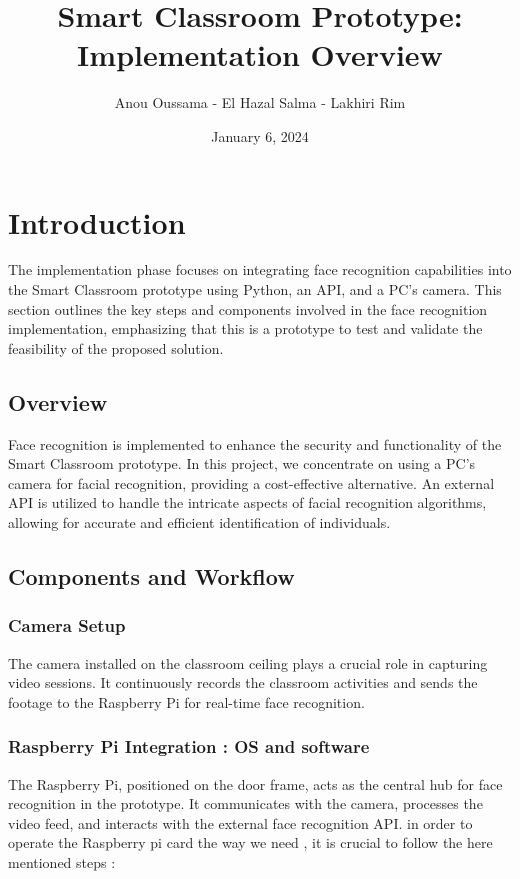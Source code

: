\documentclass[11pt]{article}
\title{\textbf{Smart Classroom Prototype: Implementation Overview}}
\author{Anou Oussama - El Hazal Salma - Lakhiri Rim}
\date{January 6, 2024}
\begin{document}
	\maketitle
	
	\section{Introduction}
	\hspace{1cm} The implementation phase focuses on integrating face recognition capabilities into the Smart Classroom prototype using Python, an API, and a PC's camera. This section outlines the key steps and components involved in the face recognition implementation, emphasizing that this is a prototype to test and validate the feasibility of the proposed solution.
	
	\hspace{1cm} \subsection{Overview}
	\hspace{1cm} Face recognition is implemented to enhance the security and functionality of the Smart Classroom prototype. In this project, we concentrate on using a PC's camera for facial recognition, providing a cost-effective alternative. An external API is utilized to handle the intricate aspects of facial recognition algorithms, allowing for accurate and efficient identification of individuals.
	
	\hspace{1cm} \subsection{Components and Workflow}
	 \subsubsection{Camera Setup}
	\hspace{1cm} \hspace{1cm} The camera installed on the classroom ceiling plays a crucial role in capturing video sessions. It continuously records the classroom activities and sends the footage to the Raspberry Pi for real-time face recognition.
	
	\hspace{1cm} \hspace{1cm} \subsubsection{Raspberry Pi Integration : OS and software }
	\hspace{1cm} \hspace{1cm} The Raspberry Pi, positioned on the door frame, acts as the central hub for face recognition in the prototype. It communicates with the camera, processes the video feed, and interacts with the external face recognition API.
    in order to operate the Raspberry pi card the way we need , it is crucial to follow the here mentioned  steps :
\end{document}
